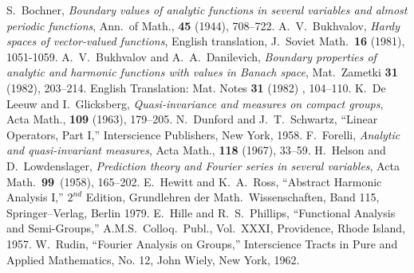 \begin{thebibliography}{Dillo 83}
%
%
 S.\ Bochner, 
{\em Boundary values of analytic functions in 
several variables and almost periodic functions}, 
Ann.\ of Math., {\bf 45} (1944), 708--722.
%
  A.\ V.\ Bukhvalov,
{\em Hardy spaces of vector-valued functions}, 
English translation, J.\ Soviet Math.\ {\bf 16} 
(1981), 1051-1059.
%
  A.\ V.\ Bukhvalov and A.\ A.\ Danilevich,
{\em Boundary properties of analytic and harmonic functions 
with values in Banach space}, Mat.\ Zametki {\bf 31} 
(1982), 203--214.  English Translation:  Mat. 
Notes {\bf 31} (1982) , 104--110.
%
  K.\ De Leeuw and I.\ Glicksberg, 
{\em Quasi-invariance and measures on compact groups},
Acta Math., {\bf 109} (1963), 179--205.
%
 N.\ Dunford and J.\ T.\ Schwartz,
``Linear Operators, Part I,'' Interscience Publishers, 
New York, 1958.
%
  F.\ Forelli,
{\em Analytic and quasi-invariant measures}, 
Acta Math., {\bf 118} (1967), 33--59.
%
  H.\ Helson and D.\ Lowdenslager,
{\em Prediction theory and Fourier series in several variables}, 
Acta Math.\ {\bf 99}\ (1958), 165--202.
%
%
 E.\ Hewitt and K.\ A.\ Ross,
``Abstract Harmonic Analysis I,''  $2^{nd}$ Edition, Grundlehren der
Math.\ Wissenschaften, Band 115, Springer--Verlag, Berlin 1979.
%
 E.\ Hille and R.\ S.\ Phillips,
``Functional Analysis and Semi-Groups,'' A.M.S.\ Colloq.\
Publ., Vol.\ XXXI, Providence, Rhode Island, 1957.
%
 W.\ Rudin, ``Fourier Analysis on Groups,''
Interscience Tracts in Pure and Applied Mathematics, No. 12, 
John Wiely, New York, 1962.
%
\end{thebibliography}


